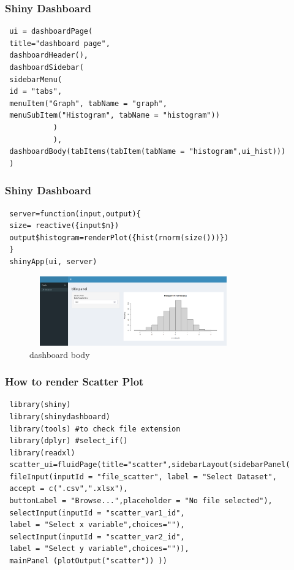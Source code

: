 \documentclass[aspectratio=169,serif,professionalfont]{beamer}
\begin{document}
\begin{frame}[fragile]
  \frametitle{Shiny Dashboard}
\begin{verbatim}
 ui = dashboardPage(
 title="dashboard page",
 dashboardHeader(),
 dashboardSidebar(
 sidebarMenu(
 id = "tabs",
 menuItem("Graph", tabName = "graph",
 menuSubItem("Histogram", tabName = "histogram"))
           )
           ),
 dashboardBody(tabItems(tabItem(tabName = "histogram",ui_hist)))
 )  
\end{verbatim}
\end{frame}

\begin{frame}[fragile]
  \frametitle{Shiny Dashboard}
\begin{verbatim}
 server=function(input,output){
 size= reactive({input$n})
 output$histogram=renderPlot({hist(rnorm(size()))})
 }
 shinyApp(ui, server) 
 \end{verbatim}
 \begin{figure}[htbp]
    \centering
    \includegraphics[width=0.8\textwidth,height=3cm]{body.png}
    \caption{ dashboard body}
    \label{fig:image_label9}
   \end{figure}

\end{frame}


\begin{frame}[fragile]
  \frametitle{How to render Scatter Plot}
\begin{verbatim}
 library(shiny)
 library(shinydashboard)
 library(tools) #to check file extension
 library(dplyr) #select_if()
 library(readxl)
 scatter_ui=fluidPage(title="scatter",sidebarLayout(sidebarPanel(
 fileInput(inputId = "file_scatter", label = "Select Dataset",
 accept = c(".csv",".xlsx"),
 buttonLabel = "Browse...",placeholder = "No file selected"),
 selectInput(inputId = "scatter_var1_id",
 label = "Select x variable",choices=""),
 selectInput(inputId = "scatter_var2_id",
 label = "Select y variable",choices="")),
 mainPanel (plotOutput("scatter")) ))
\end{verbatim}
\end{frame}
\end{document}

